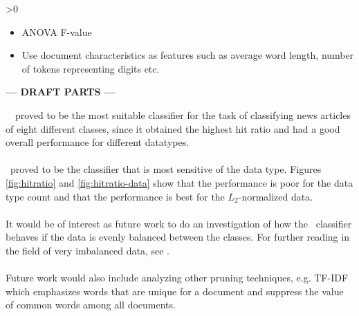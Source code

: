 \ifnum\printdraft>0
	\begin{itemize}
		\item ANOVA F-value
		\item Use document characteristics as features such as average word length, number of tokens representing digits etc.
	\end{itemize}
\else
\begin{center}
	\textbf{--- DRAFT PARTS ---}
\end{center}
\fi
\mn\ \nb\ proved to be the most suitable classifier for the task of classifying news articles of eight different classes, since it obtained the highest hit ratio and had a good overall performance for different datatypes.
\\\\
\svm\ proved to be the classifier that is most sensitive of the data type. Figures \ref{fig:hitratio} and \ref{fig:hitratio-data} show that the performance is poor for the data type count and that the performance is best for the $L_2$-normalized data.
\\\\
It would be of interest as future work to do an investigation of how the \rf\ classifier behaves if the data is evenly balanced between the classes. For further reading in the field of very imbalanced data, see \cite{Chen}.
\\\\
Future work would also include analyzing other pruning techniques, e.g. TF-IDF which emphasizes words that are unique for a document and suppress the value of common words among all documents. 
